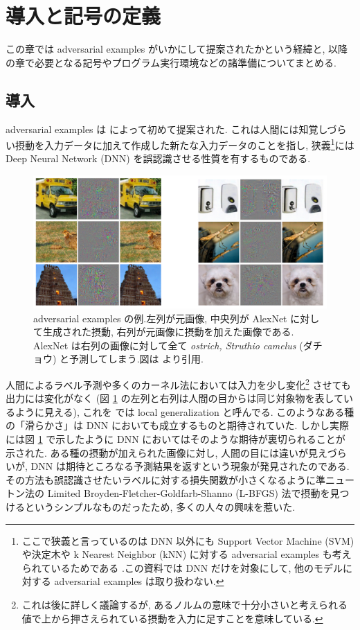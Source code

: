 \section{導入と記号の定義}
\label{sec:introduction}
この章では adversarial examples がいかにして提案されたかという経緯と, 以降の章で必要となる記号やプログラム実行環境などの諸準備についてまとめる.



\subsection{導入}
\label{subsec:introduction}
adversarial examples は \cite{szegedy2013intriguing} によって初めて提案された.
これは人間には知覚しづらい摂動を入力データに加えて作成した新たな入力データのことを指し, 狭義\footnote{ここで狭義と言っているのは DNN 以外にも Support Vector Machine (SVM) や決定木や k Nearest Neighbor (kNN) に対する adversarial examples も考えられているためである \cite{papernot2016transferability}.この資料では DNN だけを対象にして, 他のモデルに対する adversarial examples は取り扱わない.}には Deep Neural Network (DNN) を誤認識させる性質を有するものである.
%
\begin{figure}[htbp]
\begin{center}
\includegraphics[width=12.0cm]{figures/szegedy-adv-examples.pdf}
\end{center}
\caption{adversarial examples の例.左列が元画像, 中央列が AlexNet \cite{krizhevsky2012imagenet} に対して生成された摂動, 右列が元画像に摂動を加えた画像である.
AlexNet は右列の画像に対して全て \textit{ostrich, Struthio camelus} (ダチョウ) と予測してしまう.図は \cite{szegedy2013intriguing} より引用.}
\label{fig:szegedy-adv-example}
\end{figure}
%

人間によるラベル予測や多くのカーネル法においては入力を少し変化\footnote{これは後に詳しく議論するが, あるノルムの意味で十分小さいと考えられる値で上から押さえられている摂動を入力に足すことを意味している.} させても出力には変化がなく (図 \ref{fig:szegedy-adv-example} の左列と右列は人間の目からは同じ対象物を表しているように見える), これを \cite{szegedy2013intriguing} では local generalization と呼んでる. このようなある種の「滑らかさ」は DNN においても成立するものと期待されていた.
しかし実際には図 \ref{fig:szegedy-adv-example} で示したように DNN においてはそのような期待が裏切られることが示された.
ある種の摂動が加えられた画像に対し, 人間の目には違いが見えづらいが, DNN は期待ところなる予測結果を返すという現象が発見されたのである.
その方法も誤認識させたいラベルに対する損失関数が小さくなるように準ニュートン法の Limited Broyden-Fletcher-Goldfarb-Shanno (L-BFGS) 法で摂動を見つけるというシンプルなものだったため, 多くの人々の興味を惹いた.

